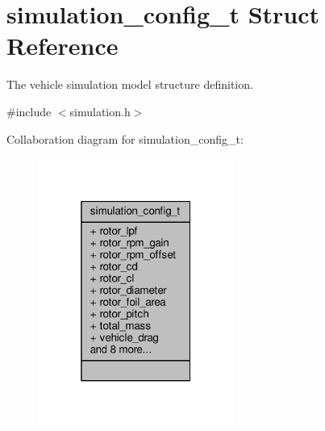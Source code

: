\hypertarget{structsimulation__config__t}{\section{simulation\+\_\+config\+\_\+t Struct Reference}
\label{structsimulation__config__t}
}


The vehicle simulation model structure definition.  




{\ttfamily \#include $<$simulation.\+h$>$}



Collaboration diagram for simulation\+\_\+config\+\_\+t\+:
\nopagebreak
\begin{figure}[H]
\begin{center}
\leavevmode
\includegraphics[width=181pt]{structsimulation__config__t__coll__graph}
\end{center}
\end{figure}
